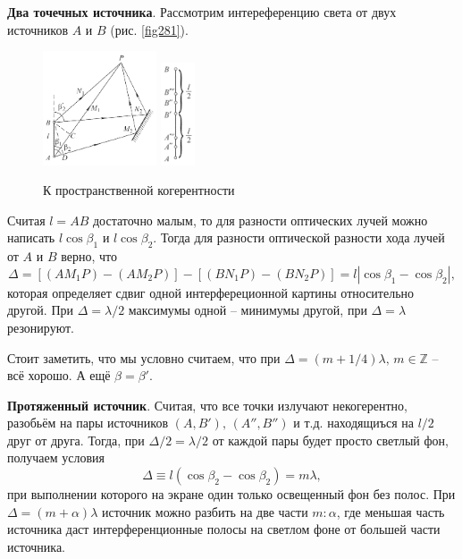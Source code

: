 


\textbf{Два точечных источника}.
Рассмотрим интереференцию света от двух источников $A$ и $B$ (рис. \eqref{fig281}). 
\begin{figure}[ht]
    \centering
    \includegraphics[width=0.3\textwidth]{figures/28_1.png}
    \hspace{5 mm} 
    \includegraphics[width=0.09\textwidth]{figures/28_2.png}
    \caption{К пространственной когерентности}
    \label{fig281}
\end{figure}
Считая $l=AB$ достаточно малым, то для разности оптических лучей можно написать $l\cos \beta_1$ и $l \cos \beta_2$. Тогда для разности оптической разности хода лучей от $A$ и $B$ верно, что
\begin{equation*}
    \Delta = 
    \left[(AM_1P)-(AM_2P)\right]-\left[(BN_1 P) - (BN_2P)\right]
   = l |\cos \beta_1 - \cos \beta_2|,
\end{equation*}
которая определяет сдвиг одной интерфереционной картины относительно другой. При $\Delta = \lambda/2$ максимумы одной -- минимумы другой, при $\Delta = \lambda$ резонируют. 

Стоит заметить, что мы условно считаем, что при $\Delta = (m+1/4)\lambda,\, m \in \mathbb{Z}$ -- всё хорошо. А ещё $\beta = \beta'$. 



\textbf{Протяженный источник}.  Считая, что все точки излучают некогерентно, разобьём на пары источников $(A, B'),\,  (A'', B'')$ и т.д. находящиъся на $l/2$ друг от друга. Тогда, при $\Delta/2 = \lambda/2$ от каждой пары будет просто светлый фон, получаем условия
\begin{equation*}
    \Delta \equiv l(\cos \beta_2 - \cos \beta_2) = m\lambda,
\end{equation*}
при выполнении которого на экране один только освещенный фон без полос. При $\Delta = (m+\alpha)\lambda$ источник можно разбить на две части $m \colon  \alpha$, где меньшая часть источника даст интерференционные полосы на светлом фоне от большей части источника. 

